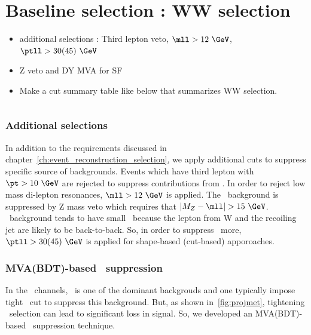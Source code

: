 \section{Baseline selection : WW selection} 
\begin{itemize} 
\item additional selections : Third lepton veto, $\mll>12~\GeV$, $\ptll>30(45)~\GeV$ 
\item Z veto and DY MVA for SF  
\item Make a cut summary table like below that summarizes WW selection. 
      \begin{figure}[htp] 
      \centering 
      \begin{tabular}{c} 
      \end{tabular} 
      \end{figure}   
\end{itemize} 



\subsubsection{Additional selections} 
In addition to the requirements discussed in chapter~\ref{ch:event_reconstruction_selection},   
we apply additional cuts to suppress specific source of backgrounds.  
Events which have third lepton with $\pt>10~\GeV$ are rejected to suppress contributions 
from \vv.
In order to reject low mass di-lepton resonances, $\mll>12~\GeV$ is applied. 
The \dyll\ background is suppressed by Z mass veto which requires that 
$\left| M_Z - \mll \right| > 15~\GeV$.
\Wjets\ background tends to have small \ptll\ because the lepton from W and 
the recoiling jet are likely to be back-to-back. So, in order to suppress 
\Wjets\ more, $\ptll>30(45)~\GeV$ is applied for shape-based (cut-based) apporoaches. 

\subsubsection{MVA(BDT)-based \dyll\ suppression} 

In the \SF\ channels, \dyll\ is one of the dominant backgrouds 
and one typically impose tight \met\ cut to suppress this background. 
But, as shown in~\ref{fig:projmet}, tightening \met\ selection
can lead to significant loss in signal. So, we developed an 
MVA(BDT)-based \dyll\ suppression technique. 

